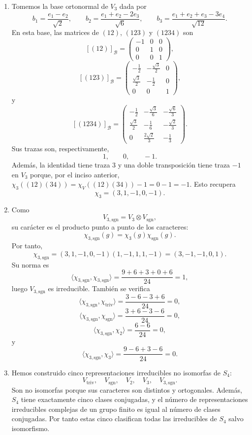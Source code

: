 \documentclass[10pt,a4paper]{article}
\begin{document}
\begin{enumerate}[label=(\alph*),leftmargin=2.4em]
\item Tomemos la base ortonormal de $V_3$ dada por
\[
  b_1=\frac{e_1-e_2}{\sqrt2},
  \qquad
  b_2=\frac{e_1+e_2-2e_3}{\sqrt6},
  \qquad
  b_3=\frac{e_1+e_2+e_3-3e_4}{\sqrt{12}}.
\]
En esta base, las matrices de $(12)$, $(123)$ y $(1234)$ son
\[
  [(12)]_{\mathcal B}
  =
  \begin{pmatrix}
    -1 & 0 & 0 \\
    0 & 1 & 0 \\
    0 & 0 & 1
  \end{pmatrix},
\]
\[
  [(123)]_{\mathcal B}
  =
  \begin{pmatrix}
    -\frac12 & -\frac{\sqrt3}{2} & 0 \\
    \frac{\sqrt3}{2} & -\frac12 & 0 \\
    0 & 0 & 1
  \end{pmatrix},
\]
y
\[
  [(1234)]_{\mathcal B}
  =
  \begin{pmatrix}
    -\frac12 & -\frac{\sqrt3}{6} & -\frac{\sqrt6}{3} \\
    \frac{\sqrt3}{2} & -\frac16 & -\frac{\sqrt2}{3} \\
    0 & \frac{2\sqrt2}{3} & -\frac13
  \end{pmatrix}.
\]
Sus trazas son, respectivamente,
\[
  1,
  \qquad 0,
  \qquad -1.
\]
Además, la identidad tiene traza $3$ y una doble transposición tiene traza $-1$ en $V_3$
porque, por el inciso anterior, $\chi_3((12)(34))=\chi_V((12)(34))-1=0-1=-1$.
Esto recupera
\[
  \chi_3=(3,1,-1,0,-1).
\]

\item Como
\[
  V_{3,\mathrm{sgn}}=V_3\otimes V_{\mathrm{sgn}},
\]
su carácter es el producto punto a punto de los caracteres:
\[
  \chi_{3,\mathrm{sgn}}(g)=\chi_3(g)\chi_{\mathrm{sgn}}(g).
\]
Por tanto,
\[
  \chi_{3,\mathrm{sgn}}
  =(3,1,-1,0,-1)(1,-1,1,1,-1)
  =(3,-1,-1,0,1).
\]
Su norma es
\[
  \langle \chi_{3,\mathrm{sgn}},\chi_{3,\mathrm{sgn}}\rangle
  =\frac{9+6+3+0+6}{24}=1,
\]
luego $V_{3,\mathrm{sgn}}$ es irreducible. También se verifica
\[
  \langle \chi_{3,\mathrm{sgn}},\chi_{\mathrm{triv}}\rangle
  =\frac{3-6-3+6}{24}=0,
\]
\[
  \langle \chi_{3,\mathrm{sgn}},\chi_{\mathrm{sgn}}\rangle
  =\frac{3+6-3-6}{24}=0,
\]
\[
  \langle \chi_{3,\mathrm{sgn}},\chi_2\rangle
  =\frac{6-6}{24}=0,
\]
y
\[
  \langle \chi_{3,\mathrm{sgn}},\chi_3\rangle
  =\frac{9-6+3-6}{24}=0.
\]

\item Hemos construido cinco representaciones irreducibles no isomorfas de $S_4$:
\[
  V_{\mathrm{triv}},\quad V_{\mathrm{sgn}},\quad V_2,\quad V_3,
  \quad V_{3,\mathrm{sgn}}.
\]
Son no isomorfas porque sus caracteres son distintos y ortogonales. Además, $S_4$ tiene
exactamente cinco clases conjugadas, y el número de representaciones irreducibles complejas
de un grupo finito es igual al número de clases conjugadas. Por tanto estas cinco clasifican
todas las irreducibles de $S_4$ salvo isomorfismo.


\end{enumerate}
\end{document}
